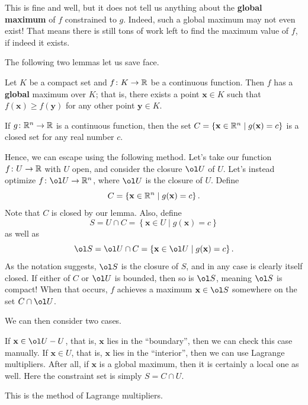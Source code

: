 \documentclass[11pt]{scrartcl}
\begin{document}
This is fine and well, but it does not tell us anything
about the \textbf{global maximum} of $f$ constrained to $g$.
Indeed, such a global maximum may not even exist!
That means there is still tons of work left to
find the maximum value of $f$, if indeed it exists.

The following two lemmas let us save face.
\begin{lemma}
  Let $K$ be a compact set and $f \colon K \to \mathbb R$ be a continuous function.
  Then $f$ has a \textbf{global} maximum over $K$; that is,
  there exists a point $\mathbf{x} \in K$ such that $f(\mathbf{x}) \ge f(\mathbf{y})$
  for any other point $\mathbf{y} \in K$.
\end{lemma}
\begin{lemma}
  If $g \colon \mathbb R^n \to \mathbb R$ is a continuous function, then the set
  $C = \left\{ \mathbf{x} \in \mathbb R^n \mid g(\mathbf{x}) = c \right\}$
  is a closed set for any real number $c$.
\end{lemma}

Hence, we can escape using the following method.
Let's take our function $f \colon U \to \mathbb R$
with $U$ open, and consider the closure $\ol U$ of $U$.
Let's instead optimize $f \colon \ol U \to \RR^n$,
where $\ol U$ is the closure of $U$. Define
\[ C = \left\{ \mathbf{x} \in \mathbb R^n \mid g(\mathbf{x}) = c \right\}. \]
Note that $C$ is closed by our lemma. Also, define
\[ S = U \cap C =
  \left\{ \mathbf{x} \in U \mid g(\mathbf{x}) = c \right\} \]
as well as
\[ \ol S = \ol U \cap C =
  \left\{ \mathbf{x} \in \ol U \mid g(\mathbf{x}) = c \right\}. \]
As the notation suggests, $\ol S$ is the closure of $S$,
and in any case is clearly itself closed.
If either of $C$ or $\ol U$ is bounded,
then so is $\ol S$, meaning $\ol S$ is compact!
When that occurs, $f$ achieves a maximum $\mathbf{x} \in \ol S$
somewhere on the set $C \cap \ol U$.

We can then consider two cases.
\begin{itemize}
  \ii If $\mathbf{x} \in \ol U - U$, that is, $\mathbf{x}$ lies in the ``boundary'',
  then we can check this case manually.
  \ii If $\mathbf{x} \in U$, that is, $\mathbf{x}$ lies in the ``interior'',
  then we can use Lagrange multipliers.
  After all, if $\mathbf{x}$ is a global maximum, then it is certainly a local one as well.
  Here the constraint set is simply $S = C \cap U$.
\end{itemize}

This is the method of Lagrange multipliers.
\end{document}
